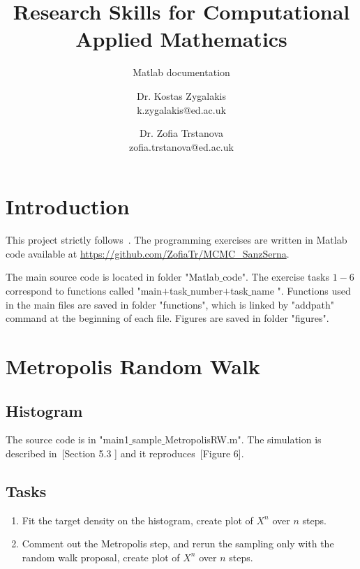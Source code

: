 \documentclass{scrartcl}
\title{Research Skills for Computational Applied Mathematics}
\subtitle{Matlab documentation}
\begin{document}
\begin{titlepage}
\author{Dr. Kostas Zygalakis\\ k.zygalakis@ed.ac.uk
\and 
Dr. Zofia Trstanova\\zofia.trstanova@ed.ac.uk}


\clearpage\maketitle
\thispagestyle{empty}
\end{titlepage}

\newpage
\setcounter{page}{1}

\section{Introduction}
This project strictly follows~\cite{sanz2014markov}. The programming exercises are written in Matlab code available at \url{https://github.com/ZofiaTr/MCMC_SanzSerna}.

The main source code is located in folder "Matlab$\_$code". The exercise tasks $1-6$ correspond to functions called "main$+$task$\_$number$+$task$\_$name ". Functions used in the main files are saved in folder "functions", which is linked by "addpath" command at the beginning of each file. Figures are saved in folder "figures".

\section{Metropolis Random Walk}

\subsection{Histogram}
The source code is in "main1$\_$sample$\_$MetropolisRW.m". The simulation is described in~\cite{sanz2014markov}[Section 5.3 ] and it reproduces~\cite{sanz2014markov}[Figure 6].

\subsection{Tasks}
\begin{enumerate}
\item Fit the target density on the histogram, create plot of $X^n$ over $n $ steps.
\item Comment out the Metropolis step, and rerun the sampling only with the random walk proposal, create plot of $X^n$ over $n $ steps.
\end{enumerate}
\end{document}
